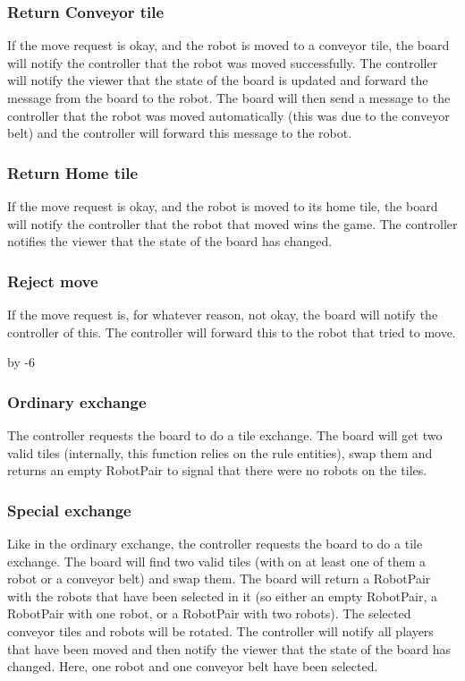 	

	\subsubsection{Return Conveyor tile}
	If the move request is okay, and the robot is moved to a conveyor tile, the board will notify the controller that the robot was moved successfully. The controller will notify the viewer that the state of the board is updated and forward the message from the board to the robot. The board will then send a message to the controller that the robot was moved automatically (this was due to the conveyor belt) and the controller will forward this message to the robot.

	

	\subsubsection{Return Home tile}
	If the move request is okay, and the robot is moved to its home tile, the board will notify the controller that the robot that moved wins the game. The controller notifies the viewer that the state of the board has changed.

	


	\subsubsection{Reject move}
	If the move request is, for whatever reason, not okay, the board will notify the controller of this. The controller will forward this to the robot that tried to move.

	


	\advance{} by -6

	\subsubsection{Ordinary exchange}
	The controller requests the board to do a tile exchange. The board will get two valid tiles (internally, this function relies on the rule entities), swap them and returns an empty RobotPair to signal that there were no robots on the tiles.

	

	\subsubsection{Special exchange}
	Like in the ordinary exchange, the controller requests the board to do a tile exchange. The board will find two valid tiles (with on at least one of them a robot or a conveyor belt) and swap them. The board will return a RobotPair with the robots that have been selected in it (so either an empty RobotPair, a RobotPair with one robot, or a RobotPair with two robots). The selected conveyor tiles and robots will be rotated. The controller will notify all players that have been moved and then notify the viewer that the state of the board has changed. Here, one robot and one conveyor belt have been selected.

